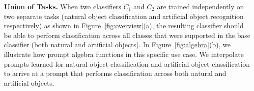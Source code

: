 \documentclass[10pt,twocolumn,letterpaper]{article}
\begin{document}










\noindent \textbf{Union of Tasks.} When two classifiers $C_1$ and $C_2$ are trained independently  on two separate tasks (natural object classification and artificial object recognition respectively) as shown in Figure~\ref{fig:overview}(a), the resulting classifier should be able to perform classification across all classes that were supported in the base classifier (both natural and artificial objects). In Figure~\ref{fig:algebra}(b), we illustrate how prompt algebra functions in this specific use case. We interpolate prompts learned for natural object classification and artificial object classification to arrive at a prompt that performs  classification across both natural and artificial objects. \\
\end{document}
